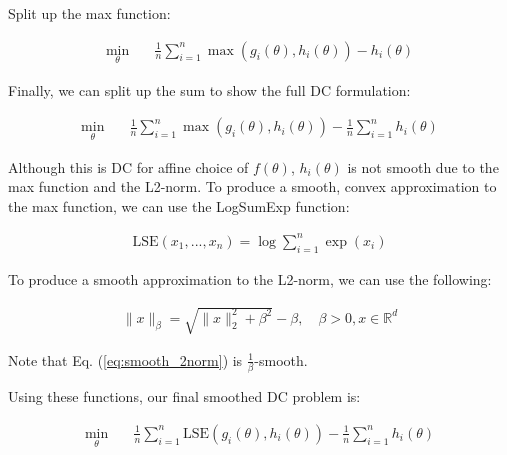 \documentclass[11pt]{article}
\begin{document}
Split up the max function:

\begin{equation}
\begin{aligned}
    \min_{\theta} \quad & \frac{1}{n} \sum_{i=1}^{n} \max(g_i(\theta), h_i(\theta)) - h_i(\theta)
\end{aligned}
\end{equation}

Finally, we can split up the sum to show the full DC formulation:

\begin{equation}
\begin{aligned}
    \min_{\theta} \quad & \frac{1}{n} \sum_{i=1}^{n} \max(g_i(\theta), h_i(\theta)) - \frac{1}{n} \sum_{i=1}^{n} h_i(\theta)
\end{aligned}
\end{equation}

Although this is DC for affine choice of $f(\theta)$, $h_i(\theta)$ is not smooth due to the max function and the L2-norm. To produce a smooth, convex approximation to the max function, we can use the LogSumExp function:

\begin{equation}
\begin{aligned}
\textrm{LSE}(x_1, ..., x_n) = \log\sum_{i=1}^{n} \exp(x_i)
\end{aligned}
\end{equation}

To produce a smooth approximation to the L2-norm, we can use the following:

\begin{equation}
\label{eq:smooth_2norm}
\begin{aligned}
\| x \|_\beta = \sqrt{\| x \|_2^2 + \beta^2} - \beta, \quad \beta > 0, x \in \mathbb{R}^d
\end{aligned}
\end{equation}

Note that Eq. (\ref{eq:smooth_2norm}) is $\frac{1}{\beta}$-smooth.

Using these functions, our final smoothed DC problem is:

\begin{equation}
\label{eq:smooth_dc}
\begin{aligned}
    \min_{\theta} \quad & \frac{1}{n} \sum_{i=1}^{n} \textrm{LSE}(g_i(\theta), h_i(\theta)) - \frac{1}{n} \sum_{i=1}^{n} h_i(\theta)
\end{aligned}
\end{equation}
\end{document}
